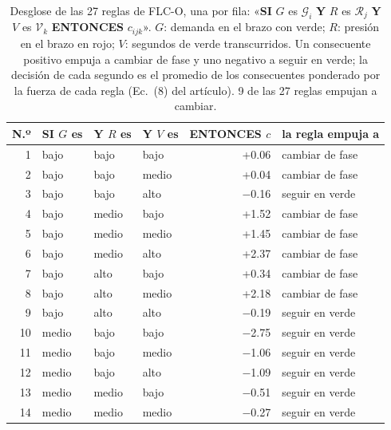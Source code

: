\begin{table}[H]
\caption{Desglose de las 27 reglas de FLC-O, una por fila: «\textbf{SI} $G$ es $\mathcal{G}_i$ \textbf{Y} $R$ es $\mathcal{R}_j$ \textbf{Y} $V$ es $\mathcal{V}_k$ \textbf{ENTONCES} $c_{ijk}$». $G$: demanda en el brazo con verde; $R$: presión en el brazo en rojo; $V$: segundos de verde transcurridos. Un consecuente positivo empuja a cambiar de fase y uno negativo a seguir en verde; la decisión de cada segundo es el promedio de los consecuentes ponderado por la fuerza de cada regla (Ec.~(8) del artículo). 9 de las 27 reglas empujan a cambiar.}
\label{tab:sreglas27}
\centering
\small
\setlength{\tabcolsep}{8pt}
\renewcommand{\arraystretch}{1.02}
\begin{tabular}{@{}rlllrl@{}}
\toprule
N.º & \textbf{SI} $G$ es & \textbf{Y} $R$ es & \textbf{Y} $V$ es & \textbf{ENTONCES} $c$ & la regla empuja a \\
\midrule
1 & bajo & bajo & bajo & +0.06 & \textcolor{red!70!black}{cambiar de fase} \\
2 & bajo & bajo & medio & +0.04 & \textcolor{red!70!black}{cambiar de fase} \\
3 & bajo & bajo & alto & $-$0.16 & \textcolor{blue!70!black}{seguir en verde} \\
4 & bajo & medio & bajo & +1.52 & \textcolor{red!70!black}{cambiar de fase} \\
5 & bajo & medio & medio & +1.45 & \textcolor{red!70!black}{cambiar de fase} \\
6 & bajo & medio & alto & +2.37 & \textcolor{red!70!black}{cambiar de fase} \\
7 & bajo & alto & bajo & +0.34 & \textcolor{red!70!black}{cambiar de fase} \\
8 & bajo & alto & medio & +2.18 & \textcolor{red!70!black}{cambiar de fase} \\
9 & bajo & alto & alto & $-$0.19 & \textcolor{blue!70!black}{seguir en verde} \\
\midrule
10 & medio & bajo & bajo & $-$2.75 & \textcolor{blue!70!black}{seguir en verde} \\
11 & medio & bajo & medio & $-$1.06 & \textcolor{blue!70!black}{seguir en verde} \\
12 & medio & bajo & alto & $-$1.09 & \textcolor{blue!70!black}{seguir en verde} \\
13 & medio & medio & bajo & $-$0.51 & \textcolor{blue!70!black}{seguir en verde} \\
14 & medio & medio & medio & $-$0.27 & \textcolor{blue!70!black}{seguir en verde} \\

\end{tabular}
\end{table}
